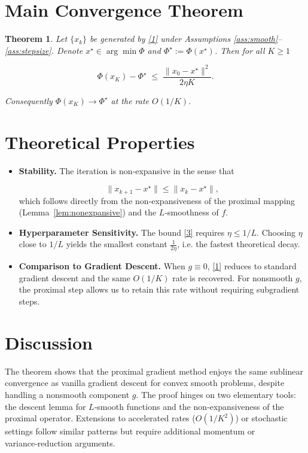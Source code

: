 \documentclass{article}
\newtheorem{theorem}{Theorem}
\begin{document}
\section*{Main Convergence Theorem}

\begin{theorem}\label{thm:conv}
Let $\{x_k\}$ be generated by \eqref{1} under Assumptions \ref{ass:smooth}–\ref{ass:stepsize}. Denote $x^\star\in\arg\min\Phi$ and $\Phi^\star:=\Phi(x^\star)$. Then for all $K\ge1$

\[
\Phi(x_K)-\Phi^\star\;\le\;\frac{\|x_0-x^\star\|^2}{2\eta K}.
\tag{3}
\]

Consequently $\Phi(x_K)\to\Phi^\star$ at the rate $O(1/K)$.
\end{theorem}

\section*{Theoretical Properties}

\begin{itemize}
  \item \textbf{Stability.} The iteration is non‑expansive in the sense that  

  \[
  \|x_{k+1}-x^\star\|\le\|x_k-x^\star\|,
  \]
  which follows directly from the non‑expansiveness of the proximal mapping (Lemma~\ref{lem:nonexpansive}) and the $L$‑smoothness of $f$.
  \item \textbf{Hyperparameter Sensitivity.} The bound \eqref{3} requires $\eta\le1/L$. Choosing $\eta$ close to $1/L$ yields the smallest constant $\frac{1}{2\eta}$, i.e. the fastest theoretical decay.
  \item \textbf{Comparison to Gradient Descent.} When $g\equiv0$, \eqref{1} reduces to standard gradient descent and the same $O(1/K)$ rate is recovered. For nonsmooth $g$, the proximal step allows us to retain this rate without requiring subgradient steps.
\end{itemize}

\section*{Discussion}

The theorem shows that the proximal gradient method enjoys the same sublinear convergence as vanilla gradient descent for convex smooth problems, despite handling a nonsmooth component $g$. The proof hinges on two elementary tools: the descent lemma for $L$‑smooth functions and the non‑expansiveness of the proximal operator. Extensions to accelerated rates ($O(1/K^2)$) or stochastic settings follow similar patterns but require additional momentum or variance‑reduction arguments.
\end{document}
